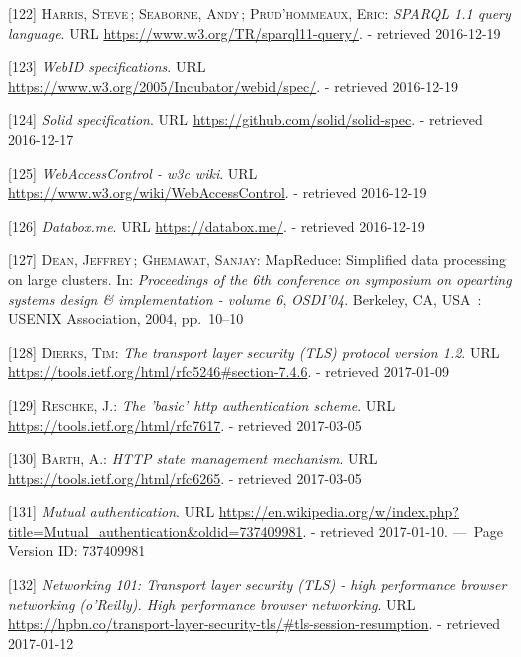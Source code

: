 \documentclass[12pt,english,a4paper,titlepage,cleardoublepage=empty,dottedtoc]{report}
\begin{document}
\hypertarget{ref-web_w3c-tr_sparql}{}
{[}122{]} \textsc{Harris, Steve}\,; \textsc{Seaborne, Andy}\,;
\textsc{Prud'hommeaux, Eric}: \emph{SPARQL 1.1 query language}. URL
\url{https://www.w3.org/TR/sparql11-query/}. - retrieved 2016-12-19

\hypertarget{ref-web_w3c-draft_webid}{}
{[}123{]} \emph{WebID specifications}. URL
\url{https://www.w3.org/2005/Incubator/webid/spec/}. - retrieved
2016-12-19

\hypertarget{ref-web_spec_solid}{}
{[}124{]} \emph{Solid specification}. URL
\url{https://github.com/solid/solid-spec}. - retrieved 2016-12-17

\hypertarget{ref-web_2016_wiki_webaccesscontrol}{}
{[}125{]} \emph{WebAccessControl - w3c wiki}. URL
\url{https://www.w3.org/wiki/WebAccessControl}. - retrieved 2016-12-19

\hypertarget{ref-web_2016_demo_databox}{}
{[}126{]} \emph{Databox.me}. URL \url{https://databox.me/}. - retrieved
2016-12-19

\hypertarget{ref-paper_2004_distributed-mapreduce}{}
{[}127{]} \textsc{Dean, Jeffrey}\,; \textsc{Ghemawat, Sanjay}:
MapReduce: Simplified data processing on large clusters. In:
\emph{Proceedings of the 6th conference on symposium on opearting
systems design \& implementation - volume 6}, \emph{OSDI'04}. Berkeley,
CA, USA~: USENIX Association, 2004, pp.~10--10

\hypertarget{ref-web_spec_tls-12_client-auth}{}
{[}128{]} \textsc{Dierks, Tim}: \emph{The transport layer security (TLS)
protocol version 1.2}. URL
\url{https://tools.ietf.org/html/rfc5246\#section-7.4.6}. - retrieved
2017-01-09

\hypertarget{ref-web_spec_basic-auth}{}
{[}129{]} \textsc{Reschke, J.}: \emph{The 'basic' http authentication
scheme}. URL \url{https://tools.ietf.org/html/rfc7617}. - retrieved
2017-03-05

\hypertarget{ref-web_spec_cookie}{}
{[}130{]} \textsc{Barth, A.}: \emph{HTTP state management mechanism}.
URL \url{https://tools.ietf.org/html/rfc6265}. - retrieved 2017-03-05

\hypertarget{ref-web_2017_wikipedia_mutual-auth}{}
{[}131{]} \emph{Mutual authentication}. URL
\url{https://en.wikipedia.org/w/index.php?title=Mutual_authentication\&oldid=737409981}.
- retrieved 2017-01-10. ---~Page Version ID: 737409981

\hypertarget{ref-book_2013_networking-101_tls-session-resumption}{}
{[}132{]} \emph{Networking 101: Transport layer security (TLS) - high
performance browser networking (o'Reilly). High performance browser
networking}. URL
\url{https://hpbn.co/transport-layer-security-tls/\#tls-session-resumption}.
- retrieved 2017-01-12
\end{document}
